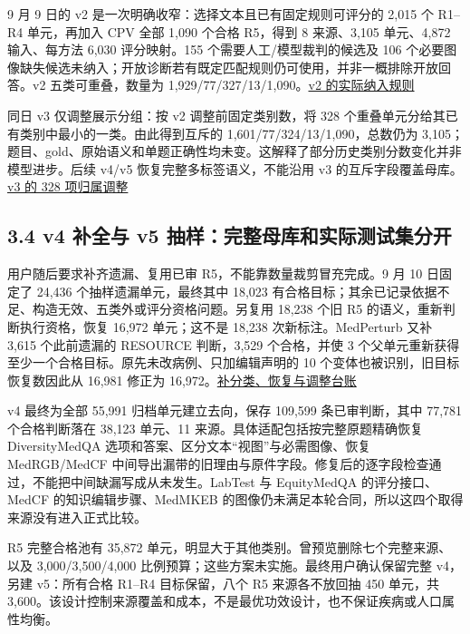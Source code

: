 \documentclass[
  11pt,
  a4paper,
]{article}
\begin{document}
9 月 9 日的 v2 是一次明确收窄：选择文本且已有固定规则可评分的 2,015 个
R1--R4 单元，再加入 CPV 全部 1,090 个合格 R5，得到 8 来源、3,105
单元、4,872 输入、每方法 6,030 评分映射。155 个需要人工/模型裁判的候选及
106
个必要图像缺失候选未纳入；开放诊断若有既定匹配规则仍可使用，并非一概排除开放回答。v2
五类可重叠，数量为
1,929/77/327/13/1,090。\href{https://github.com/xiotakut/cf_mrg/blob/main/papers/2026-10-02_cf_moa/author_dossier/records/data/construction.md\#L490}{v2
的实际纳入规则}

同日 v3 仅调整展示分组：按 v2 调整前固定类别数，将 328
个重叠单元分给其已有类别中最小的一类。由此得到互斥的
1,601/77/324/13/1,090，总数仍为
3,105；题目、gold、原始语义和单题正确性均未变。这解释了部分历史类别分数变化并非模型进步。后续
v4/v5 恢复完整多标签语义，不能沿用 v3
的互斥字段覆盖母库。\href{https://github.com/xiotakut/cf_mrg/blob/main/papers/2026-10-02_cf_moa/author_dossier/records/data/construction.md\#L553}{v3
的 328 项归属调整}

\subsection{3.4 v4 补全与 v5
抽样：完整母库和实际测试集分开}\label{v4-ux8865ux5168ux4e0e-v5-ux62bdux6837ux5b8cux6574ux6bcdux5e93ux548cux5b9eux9645ux6d4bux8bd5ux96c6ux5206ux5f00}

用户随后要求补齐遗漏、复用已审 R5，不能靠数量裁剪冒充完成。9 月 10
日固定了 24,436 个抽样遗漏单元，最终其中 18,023
有合格目标；其余已记录依据不足、构造无效、五类外或评分资格问题。另复用
18,238 个旧 R5 的语义，重新判断执行资格，恢复 16,972 单元；这不是 18,238
次新标注。MedPerturb 又补 3,615 个此前遗漏的 RESOURCE 判断，3,529
个合格，并使 3
个父单元重新获得至少一个合格目标。原先未改病例、只加编辑声明的 10
个变体也被识别，旧目标恢复数因此从 16,981 修正为
16,972。\href{https://github.com/xiotakut/cf_mrg/blob/main/papers/2026-10-02_cf_moa/author_dossier/records/data/construction.md\#L2343}{补分类、恢复与调整台账}

v4 最终为全部 55,991 归档单元建立去向，保存 109,599 条已审判断，其中
77,781 个合格判断落在 38,123 单元、11
来源。具体适配包括按完整原题精确恢复 DiversityMedQA
选项和答案、区分文本``视图''与必需图像、恢复 MedRGB/MedCF
中间导出漏带的旧理由与原件字段。修复后的逐字段检查通过，不能把中间缺漏写成从未发生。LabTest
与 EquityMedQA 的评分接口、MedCF 的知识编辑步骤、MedMKEB
的图像仍未满足本轮合同，所以这四个取得来源没有进入正式比较。

R5 完整合格池有 35,872
单元，明显大于其他类别。曾预览删除七个完整来源、以及 3,000/3,500/4,000
比例预算；这些方案未实施。最终用户确认保留完整 v4，另建 v5：所有合格
R1--R4 目标保留，八个 R5 来源各不放回抽 450 单元，共
3,600。该设计控制来源覆盖和成本，不是最优功效设计，也不保证疾病或人口属性均衡。
\end{document}
